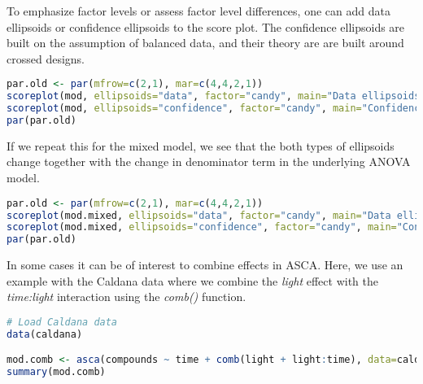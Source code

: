 \label{data-ellipsoids-and-confidence-ellipsoids}

To emphasize factor levels or assess factor level differences, one can
add data ellipsoids or confidence ellipsoids to the score plot. The
confidence ellipsoids are built on the assumption of balanced data, and
their theory are are built around crossed designs.

\begin{lstlisting}[language=R, columns=fullflexible, basicstyle=\linespread{0.85}\small\ttfamily, stringstyle=\color{DarkGreen}, keywordstyle=\color{blue}, commentstyle=\color{DarkGreen},]
par.old <- par(mfrow=c(2,1), mar=c(4,4,2,1))
scoreplot(mod, ellipsoids="data", factor="candy", main="Data ellipsoids")
scoreplot(mod, ellipsoids="confidence", factor="candy", main="Confidence ellipsoids")
par(par.old)
\end{lstlisting}

If we repeat this for the mixed model, we see that the both types of
ellipsoids change together with the change in denominator term in the
underlying ANOVA model.

\begin{lstlisting}[language=R, columns=fullflexible, basicstyle=\linespread{0.85}\small\ttfamily, stringstyle=\color{DarkGreen}, keywordstyle=\color{blue}, commentstyle=\color{DarkGreen},]
par.old <- par(mfrow=c(2,1), mar=c(4,4,2,1))
scoreplot(mod.mixed, ellipsoids="data", factor="candy", main="Data ellipsoids")
scoreplot(mod.mixed, ellipsoids="confidence", factor="candy", main="Confidence ellipsoids")
par(par.old)
\end{lstlisting}

\label{combined-effects}

In some cases it can be of interest to combine effects in ASCA. Here, we
use an example with the Caldana data where we combine the \emph{light}
effect with the \emph{time:light} interaction using the \emph{comb()}
function.

\begin{lstlisting}[language=R, columns=fullflexible, basicstyle=\linespread{0.85}\small\ttfamily, stringstyle=\color{DarkGreen}, keywordstyle=\color{blue}, commentstyle=\color{DarkGreen},]
# Load Caldana data
data(caldana)

mod.comb <- asca(compounds ~ time + comb(light + light:time), data=caldana)
summary(mod.comb)
\end{lstlisting}

